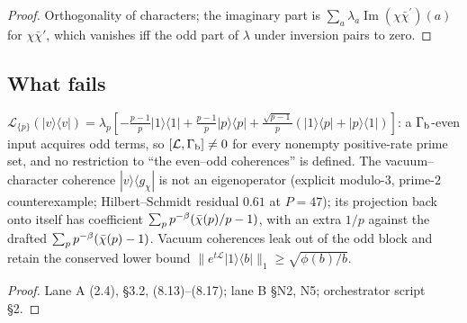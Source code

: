 \begin{proof}
Orthogonality of characters; the imaginary part is $\sum_a\lambda_a\operatorname{Im}(\chi\bar\chi^{\prime})(a)$ for
$\chi\bar\chi'$, which vanishes iff the odd part of $\lambda$ under inversion pairs to zero.
\end{proof}

\subsection{What fails}

\begin{proposition}
\label{prop:phase-grading-not-invariant}
$\mathcal L_{\{p\}}(|v\rangle\langle v|) = \lambda_p[-\tfrac{p-1}p|1\rangle\langle1| + \tfrac{p-1}p|p\rangle\langle p|
+ \tfrac{\sqrt{p-1}}p(|1\rangle\langle p| + |p\rangle\langle1|)]$: a $\Gamma_{\mathrm b}$-even input acquires odd terms,
so $[\mathcal L,\Gamma_{\mathrm b}]\ne0$ for every nonempty positive-rate prime set, and no restriction to ``the
even--odd coherences'' is defined. The vacuum--character coherence $|v\rangle\langle g_\chi|$ is not an
eigenoperator (explicit modulo-$3$, prime-$2$ counterexample; Hilbert--Schmidt residual $0.61$ at $P = 47$);
its projection back onto itself has coefficient $\sum_pp^{-\beta}(\bar\chi(p)/p-1)$, with an extra $1/p$
against the drafted $\sum_pp^{-\beta}(\bar\chi(p)-1)$. Vacuum coherences leak out of the odd block
and retain the conserved lower bound $\|e^{t\mathcal L}|1\rangle\langle b|\|_1\ge\sqrt{\phi(b)/b}$.
\end{proposition}

\begin{proof}
Lane A (2.4), \S3.2, (8.13)--(8.17); lane B \S N2, N5; orchestrator script \S2.
\end{proof}

